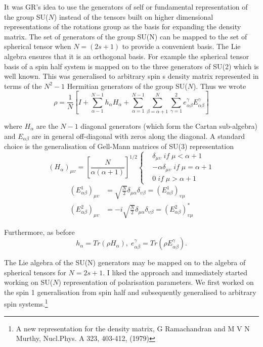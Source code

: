 It was GR’s idea to use the generators of self or fundamental representation of the group SU($N$) instead of the tensors built on higher dimensional representations of the rotations group as the basis for expanding the density
matrix. The set of generators of the group SU(N) can be mapped to the set of spherical tensor when $N = (2s + 1)$ to provide a convenient basis. The Lie algebra ensures that it is an orthogonal basis. For example the spherical tensor basis of a spin half system is mapped on to the three generators of SU(2) which is well known. This was generalised to arbitrary spin s density matrix represented in terms of the $N^{2}-1$ Hermitian generators of the group SU($N$). Thus we wrote
$$
\rho = \dfrac{1}{N}\left[I + \sum\limits_{\alpha-1}^{N-1}h_{\alpha}H_{\alpha} + \sum\limits_{\alpha=1}^{N-1}\sum\limits_{\beta=\alpha+1}^{N}\sum\limits_{\gamma=1}^{2} e_{\alpha \beta}^{\gamma}E_{\alpha \beta}^{\gamma}\right]
$$

where $H_{\alpha}$ are the $N-1$ diagonal generators (which form the Cartan sub-algebra) and $E_{\alpha\beta}$ are in general off-diagonal with zeros along the diagonal. A standard choice is the generalisation of Gell-Mann matrices of SU(3) representation
\begin{equation*}
(H_{\alpha})_{\mu\upsilon} = \left[\dfrac{N}{\alpha(\alpha + 1)}\right]^{1/2} 
\begin{cases} 
& \delta_{\mu\upsilon}\; if\; \mu < \alpha + 1\\
& -\alpha \delta_{\mu\upsilon}\; if\; \mu=\alpha + 1\\
& 0\; if\; \mu > \alpha + 1 
\end{cases}
\end{equation*}
\begin{align*}
(E_{\alpha \beta}^{1})_{\mu\upsilon} &= \sqrt{\frac{N}{2}} \delta_{\mu \alpha} \delta_{\upsilon\beta} = (E_{\alpha \beta}^{1})_{\upsilon \mu}\\
(E_{\alpha \beta}^{2})_{\mu\upsilon} &= -i\sqrt{\frac{N}{2}} \delta_{\mu \alpha} \delta_{\upsilon\beta} = (E_{\alpha \beta}^{2})_{\upsilon \mu}^{\ast}
\end{align*}

Furthermore, as before
$$
h_{\alpha}= Tr(\rho H_{\alpha}), \; e_{\alpha \beta}^{\gamma}= Tr(\rho E_{\alpha\beta}^{\gamma}).
$$

 The Lie algebra of the SU(N) generators may be mapped on to the algebra of spherical tensors for $N = 2s+1$. I liked the approach and immediately started working on SU($N$) representation of polarisation parameters. We first worked on the spin 1 generalisation from spin half and subsequently generalised to arbitrary spin systems.\footnote{A new representation for the density matrix, G Ramachandran and M V N Murthy, Nucl.Phys. A 323, 403-412, (1979)} 

